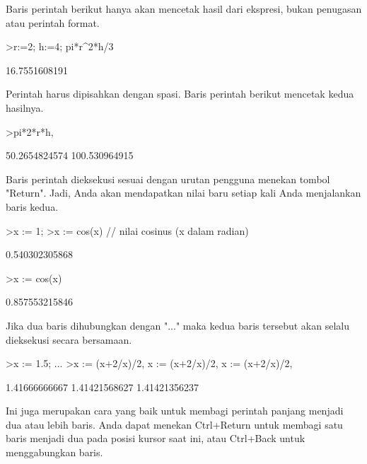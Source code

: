 \begin{eulernotebook}
\begin{eulercomment}
Baris perintah berikut hanya akan mencetak hasil dari ekspresi, bukan
penugasan atau perintah format.
\end{eulercomment}
\begin{eulerprompt}
>r:=2; h:=4; pi*r^2*h/3
\end{eulerprompt}
\begin{euleroutput}
  16.7551608191
\end{euleroutput}
\begin{eulercomment}
Perintah harus dipisahkan dengan spasi. Baris perintah berikut
mencetak kedua hasilnya.
\end{eulercomment}
\begin{eulerprompt}
>pi*2*r*h, %
\end{eulerprompt}
\begin{euleroutput}
  50.2654824574
  100.530964915
\end{euleroutput}
\begin{eulercomment}
Baris perintah dieksekusi sesuai dengan urutan pengguna menekan tombol
"Return". Jadi, Anda akan mendapatkan nilai baru setiap kali Anda
menjalankan baris kedua.
\end{eulercomment}
\begin{eulerprompt}
>x := 1;
>x := cos(x) // nilai cosinus (x dalam radian)
\end{eulerprompt}
\begin{euleroutput}
  0.540302305868
\end{euleroutput}
\begin{eulerprompt}
>x := cos(x)
\end{eulerprompt}
\begin{euleroutput}
  0.857553215846
\end{euleroutput}
\begin{eulercomment}
Jika dua baris dihubungkan dengan "..." maka kedua baris tersebut akan
selalu dieksekusi secara bersamaan.
\end{eulercomment}
\begin{eulerprompt}
>x := 1.5; ...
>x := (x+2/x)/2, x := (x+2/x)/2, x := (x+2/x)/2, 
\end{eulerprompt}
\begin{euleroutput}
  1.41666666667
  1.41421568627
  1.41421356237
\end{euleroutput}
\begin{eulercomment}
Ini juga merupakan cara yang baik untuk membagi perintah panjang
menjadi dua atau lebih baris. Anda dapat menekan Ctrl+Return untuk
membagi satu baris menjadi dua pada posisi kursor saat ini, atau
Ctrl+Back untuk menggabungkan baris.


\end{eulercomment}
\end{eulernotebook}
